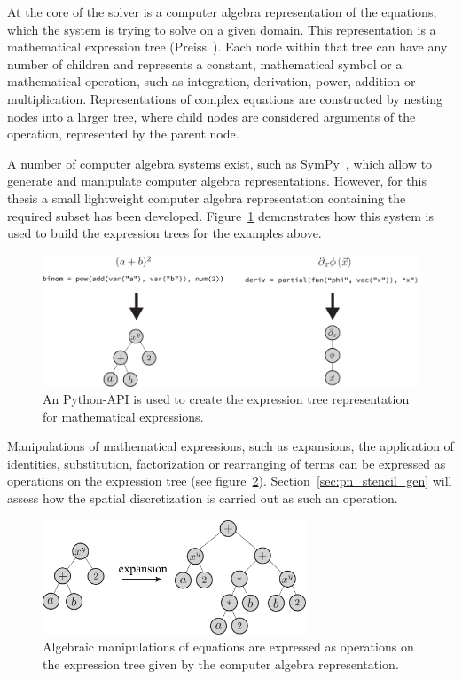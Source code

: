 At the core of the solver is a computer algebra representation of the equations, which the system is trying to solve on a given domain. This representation is a mathematical expression tree (Preiss~\cite{Preiss00}). Each node within that tree can have any number of children and represents a constant, mathematical symbol or a mathematical operation, such as integration, derivation, power, addition or multiplication. Representations of complex equations are constructed by nesting nodes into a larger tree, where child nodes are considered arguments of the operation, represented by the parent node.

A number of computer algebra systems exist, such as SymPy~\cite{Meurer17}, which allow to generate and manipulate computer algebra representations. However, for this thesis a small lightweight computer algebra representation containing the required subset has been developed. Figure~\ref{fig:pn_math_expression_tree_generation} demonstrates how this system is used to build the expression trees for the examples above.
\begin{figure}[h]
\centering
\includegraphics[width=1.0\textwidth]{04_pn_method/figures/fig_car_representation2.pdf}
\caption{An Python-API is used to create the expression tree representation for mathematical expressions.}
\label{fig:pn_math_expression_tree_generation}
\end{figure}

Manipulations of mathematical expressions, such as expansions, the application of identities, substitution, factorization or rearranging of terms can be expressed as operations on the expression tree (see figure~\ref{fig:pn_math_expression_tree_manipulation}). Section~\ref{sec:pn_stencil_gen} will assess how the spatial discretization is carried out as such an operation.
\begin{figure}[h]
\centering
\includegraphics[width=0.7\textwidth]{04_pn_method/figures/fig_car_expansion.pdf}
\caption{Algebraic manipulations of equations are expressed as operations on the expression tree given by the computer algebra representation.}
\label{fig:pn_math_expression_tree_manipulation}
\end{figure}

